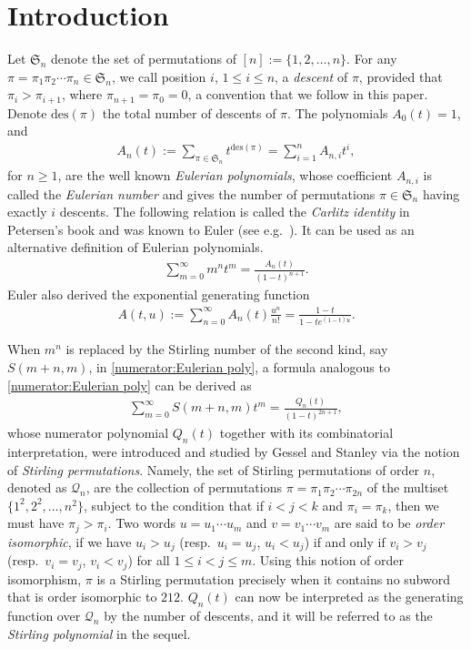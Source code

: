 \documentclass[11pt,reqno]{amsart}
\numberwithin{equation}{section}
\theoremstyle{plain}
\theoremstyle{definition}
\newcommand{\s}{\mathfrak{S}}
\newcommand{\Q}{\mathcal{Q}}
\def\des{\mathrm{des}}
\begin{document}

\section{Introduction}\label{sect: intro}

Let $\s_n$ denote the set of permutations of $[n]:=\{1,2,\ldots,n\}$. For any $\pi=\pi_1\pi_2\cdots\pi_n\in\s_n$, we call position $i$, $1\le i\le n$, a {\em descent} of $\pi$, provided that $\pi_i>\pi_{i+1}$, where $\pi_{n+1}=\pi_0=0$, a convention that we follow in this paper. Denote $\des(\pi)$ the total number of descents of $\pi$. The polynomials $A_0(t)=1$, and
\begin{align}\label{comb:Eulerian poly}
A_n(t):=\sum_{\pi\in\s_n}t^{\des(\pi)}=\sum_{i=1}^{n}A_{n,i}t^i,
\end{align}
for $n\ge 1$, are the well known {\em Eulerian polynomials}, whose coefficient $A_{n,i}$ is called the {\em Eulerian number} and gives the number of permutations $\pi\in\s_n$ having exactly $i$ descents. The following relation is called the {\em Carlitz identity} in Petersen's book \cite{Petbook} and was known to Euler (see e.g.~\cite{Foa}). It can be used as an alternative definition of Eulerian polynomials.
\begin{align}\label{numerator:Eulerian poly}
\sum_{m=0}^{\infty}m^n t^m = \frac{A_n(t)}{(1-t)^{n+1}}.
\end{align}
Euler also derived the exponential generating function
\begin{align}\label{gf:Eulerian poly}
A(t,u):=\sum_{n=0}^{\infty}A_n(t)\frac{u^n}{n!}=\frac{1-t}{1-te^{(1-t)u}}.
\end{align}

When $m^n$ is replaced by the Stirling number of the second kind, say $S(m+n,m)$, in \eqref{numerator:Eulerian poly}, a formula analogous to \eqref{numerator:Eulerian poly} can be derived as
\begin{align}\label{numerator:Stirling perm}
\sum_{m=0}^{\infty}S(m+n,m)t^m=\frac{Q_n(t)}{(1-t)^{2n+1}},
\end{align} 
whose numerator polynomial $Q_n(t)$ together with its combinatorial interpretation, were introduced and studied by Gessel and Stanley \cite{GS} via the notion of \emph{Stirling permutations}. Namely, the set of Stirling permutations of order $n$, denoted as $\Q_n$, are the collection of permutations $\pi=\pi_1\pi_2\cdots\pi_{2n}$ of the multiset $\{1^2,2^2,\ldots,n^2\}$, subject to the condition that if $i<j<k$ and $\pi_i=\pi_k$, then we must have $\pi_j>\pi_i$. Two words $u=u_1\cdots u_m$ and $v=v_1\cdots v_m$ are said to be {\em order isomorphic}, if we have $u_i>u_j$ (resp.~$u_i=u_j$, $u_i<u_j$) if and only if $v_i>v_j$ (resp.~$v_i=v_j$, $v_i<v_j$) for all $1\le i<j\le m$. Using this notion of order isomorphism, $\pi$ is a Stirling permutation precisely when it contains no subword that is order isomorphic to $212$. $Q_n(t)$ can now be interpreted as the generating function over $\Q_n$ by the number of descents, and it will be referred to as the {\em Stirling polynomial} in the sequel.
\end{document}
